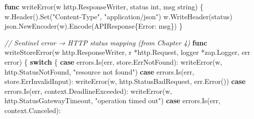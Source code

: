 \documentclass[
]{article}
\newenvironment{Shaded}{}{}
\newcommand{\CommentTok}[1]{\textcolor[rgb]{0.38,0.63,0.69}{\textit{#1}}}
\newcommand{\ControlFlowTok}[1]{\textcolor[rgb]{0.00,0.44,0.13}{\textbf{#1}}}
\newcommand{\DataTypeTok}[1]{\textcolor[rgb]{0.56,0.13,0.00}{#1}}
\newcommand{\KeywordTok}[1]{\textcolor[rgb]{0.00,0.44,0.13}{\textbf{#1}}}
\newcommand{\NormalTok}[1]{#1}
\newcommand{\OperatorTok}[1]{\textcolor[rgb]{0.40,0.40,0.40}{#1}}
\newcommand{\StringTok}[1]{\textcolor[rgb]{0.25,0.44,0.63}{#1}}
\begin{document}
\begin{Shaded}
\begin{Highlighting}[]
\KeywordTok{func}\NormalTok{ writeError}\OperatorTok{(}\NormalTok{w http}\OperatorTok{.}\NormalTok{ResponseWriter}\OperatorTok{,}\NormalTok{ status }\DataTypeTok{int}\OperatorTok{,}\NormalTok{ msg }\DataTypeTok{string}\OperatorTok{)} \OperatorTok{\{}
\NormalTok{    w}\OperatorTok{.}\NormalTok{Header}\OperatorTok{().}\NormalTok{Set}\OperatorTok{(}\StringTok{"Content{-}Type"}\OperatorTok{,} \StringTok{"application/json"}\OperatorTok{)}
\NormalTok{    w}\OperatorTok{.}\NormalTok{WriteHeader}\OperatorTok{(}\NormalTok{status}\OperatorTok{)}
\NormalTok{    json}\OperatorTok{.}\NormalTok{NewEncoder}\OperatorTok{(}\NormalTok{w}\OperatorTok{).}\NormalTok{Encode}\OperatorTok{(}\NormalTok{APIResponse}\OperatorTok{\{}\NormalTok{Error}\OperatorTok{:}\NormalTok{ msg}\OperatorTok{\})}
\OperatorTok{\}}

\CommentTok{// Sentinel error → HTTP status mapping (from Chapter 4)}
\KeywordTok{func}\NormalTok{ writeStoreError}\OperatorTok{(}\NormalTok{w http}\OperatorTok{.}\NormalTok{ResponseWriter}\OperatorTok{,}\NormalTok{ r }\OperatorTok{*}\NormalTok{http}\OperatorTok{.}\NormalTok{Request}\OperatorTok{,}\NormalTok{ logger }\OperatorTok{*}\NormalTok{zap}\OperatorTok{.}\NormalTok{Logger}\OperatorTok{,}\NormalTok{ err }\DataTypeTok{error}\OperatorTok{)} \OperatorTok{\{}
    \ControlFlowTok{switch} \OperatorTok{\{}
    \ControlFlowTok{case}\NormalTok{ errors}\OperatorTok{.}\NormalTok{Is}\OperatorTok{(}\NormalTok{err}\OperatorTok{,}\NormalTok{ store}\OperatorTok{.}\NormalTok{ErrNotFound}\OperatorTok{):}
\NormalTok{        writeError}\OperatorTok{(}\NormalTok{w}\OperatorTok{,}\NormalTok{ http}\OperatorTok{.}\NormalTok{StatusNotFound}\OperatorTok{,} \StringTok{"resource not found"}\OperatorTok{)}
    \ControlFlowTok{case}\NormalTok{ errors}\OperatorTok{.}\NormalTok{Is}\OperatorTok{(}\NormalTok{err}\OperatorTok{,}\NormalTok{ store}\OperatorTok{.}\NormalTok{ErrInvalidInput}\OperatorTok{):}
\NormalTok{        writeError}\OperatorTok{(}\NormalTok{w}\OperatorTok{,}\NormalTok{ http}\OperatorTok{.}\NormalTok{StatusBadRequest}\OperatorTok{,}\NormalTok{ err}\OperatorTok{.}\NormalTok{Error}\OperatorTok{())}
    \ControlFlowTok{case}\NormalTok{ errors}\OperatorTok{.}\NormalTok{Is}\OperatorTok{(}\NormalTok{err}\OperatorTok{,}\NormalTok{ context}\OperatorTok{.}\NormalTok{DeadlineExceeded}\OperatorTok{):}
\NormalTok{        writeError}\OperatorTok{(}\NormalTok{w}\OperatorTok{,}\NormalTok{ http}\OperatorTok{.}\NormalTok{StatusGatewayTimeout}\OperatorTok{,} \StringTok{"operation timed out"}\OperatorTok{)}
    \ControlFlowTok{case}\NormalTok{ errors}\OperatorTok{.}\NormalTok{Is}\OperatorTok{(}\NormalTok{err}\OperatorTok{,}\NormalTok{ context}\OperatorTok{.}\NormalTok{Canceled}\OperatorTok{):}

\end{Highlighting}
\end{Shaded}
\end{document}

